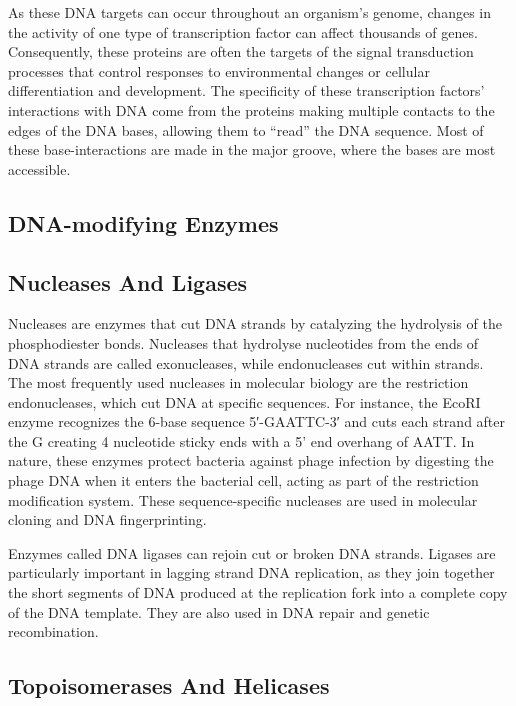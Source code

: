As these DNA targets can occur throughout an organism's genome, changes in the activity of one type of transcription factor can affect thousands of genes. Consequently, these proteins are often the targets of the signal transduction processes that control responses to environmental changes or cellular differentiation and development. The specificity of these transcription factors' interactions with DNA come from the proteins making multiple contacts to the edges of the DNA bases, allowing them to ``read'' the DNA sequence. Most of these base-interactions are made in the major groove, where the bases are most accessible.

\hypertarget{dna-modifying-enzymes}{%
\subsection{DNA-modifying Enzymes}\label{dna-modifying-enzymes}}

\hypertarget{nucleases-and-ligases}{%
\subsection{Nucleases And Ligases}\label{nucleases-and-ligases}}

Nucleases are enzymes that cut DNA strands by catalyzing the hydrolysis of the phosphodiester bonds. Nucleases that hydrolyse nucleotides from the ends of DNA strands are called exonucleases, while endonucleases cut within strands. The most frequently used nucleases in molecular biology are the restriction endonucleases, which cut DNA at specific sequences. For instance, the EcoRI enzyme recognizes the 6-base sequence 5′-GAATTC-3′ and cuts each strand after the G creating 4 nucleotide sticky ends with a 5' end overhang of AATT. In nature, these enzymes protect bacteria against phage infection by digesting the phage DNA when it enters the bacterial cell, acting as part of the restriction modification system. These sequence-specific nucleases are used in molecular cloning and DNA fingerprinting.

Enzymes called DNA ligases can rejoin cut or broken DNA strands. Ligases are particularly important in lagging strand DNA replication, as they join together the short segments of DNA produced at the replication fork into a complete copy of the DNA template. They are also used in DNA repair and genetic recombination.

\hypertarget{topoisomerases-and-helicases}{%
\subsection{Topoisomerases And Helicases}\label{topoisomerases-and-helicases}}

